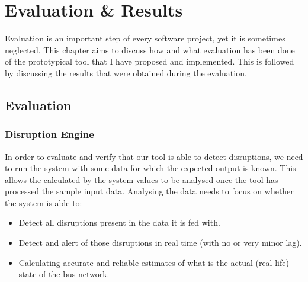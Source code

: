 \chapter{Evaluation \& Results}
Evaluation is an important step of every software project, yet it is sometimes neglected. This chapter aims to discuss how and what evaluation has been done of the prototypical tool that I have proposed and implemented. This is followed by discussing the results that were obtained during the evaluation.

\section{Evaluation}

\subsection{Disruption Engine}
In order to evaluate and verify that our tool is able to detect disruptions, we need to run the system with some data for which the expected output is known. This allows the calculated by the system values to be analysed once the tool has processed the sample input data. Analysing the data needs to focus on whether the system is able to:
\begin{itemize}
	\item Detect all disruptions present in the data it is fed with.
	\item Detect and alert of those disruptions in real time (with no or very minor lag).
	\item Calculating accurate and reliable estimates of what is the actual (real-life) state of the bus network.
\end{itemize}

